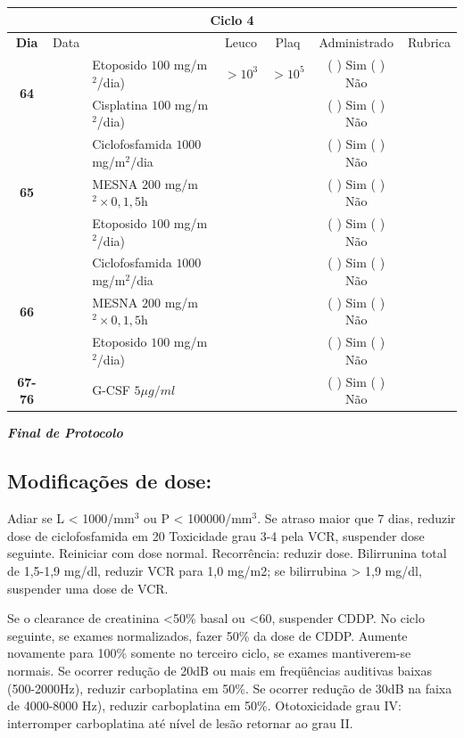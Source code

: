 \documentclass[11pt,a4paper,oldfontcommands]{memoir}
\begin{document}
\begin{center}
\begin{longtable}{p{1cm}c|p{5cm}|p{1.5cm}p{1.5cm}|c|c}
	\hline
	\multicolumn{7}{c}{Ciclo 4} \\
	\hline
	\multicolumn{1}{c|}{\multirow{1}{*}{\textbf{Dia}}}&{Data}&{}&\multicolumn{1}{c|}{Leuco}&\multicolumn{1}{c|}{Plaq}&{Administrado}&{Rubrica} \\
    \hline
    \multicolumn{1}{c|}{\multirow{2}{*}{\textbf{64}}}&&{Etoposido \(100\) mg/m\(^2\)/dia)}&\multicolumn{1}{c|}{\(>10^3\)}&\multicolumn{1}{c|}{\(>10^5\)}&{(  ) Sim (  ) Não}&\\
    \cline{4-5}
    \multicolumn{1}{c|}{}&\multirow{1}{*}{}&{Cisplatina \(100\) mg/m\(^2\)/dia)}&&&{(  ) Sim (  ) Não}&\\
    \hline
    \multicolumn{1}{c|}{\multirow{3}{*}{\textbf{65}}}&&{Ciclofosfamida \(1000\) mg/m\(^2\)/dia}&{}&&{(  ) Sim (  ) Não}&\\
    \multicolumn{1}{c|}{}&&{MESNA \(200\) mg/m\(^2 \times 0,1,5\)h}&&&{(  ) Sim (  ) Não}&\\
    \multicolumn{1}{c|}{}&&{Etoposido \(100\) mg/m\(^2\)/dia)}&&&{(  ) Sim (  ) Não}&\\
    \hline
    \multicolumn{1}{c|}{\multirow{3}{*}{\textbf{66}}}&&{Ciclofosfamida \(1000\) mg/m\(^2\)/dia}&{}&&{(  ) Sim (  ) Não}&\\
    \multicolumn{1}{c|}{}&&{MESNA \(200\) mg/m\(^2 \times 0,1,5\)h}&&&{(  ) Sim (  ) Não}&\\
    \multicolumn{1}{c|}{}&\multirow{1}{*}{}&{Etoposido \(100\) mg/m\(^2\)/dia)}&{}&&{(  ) Sim (  ) Não}&\\
    \hline
    \multicolumn{1}{c|}{\textbf{67-76}}&&{G-CSF \(5 \mu g/ml\) }&&&{(  ) Sim (  ) Não}&\\
    \hline
\end{longtable}
\textit{\textbf{Final de Protocolo}}
\end{center}
\subsection{Modificações de dose:}

Adiar se L < 1000/mm\(^3\) ou P < 100000/mm\(^3\). Se atraso maior que 7 dias, reduzir dose de ciclofosfamida em 20%
Toxicidade grau 3-4 pela VCR, suspender dose seguinte. Reiniciar com dose normal. Recorrência: reduzir dose.
Bilirrunina total de 1,5-1,9 mg/dl, reduzir VCR para 1,0 mg/m2; se bilirrubina > 1,9 mg/dl, suspender uma dose de VCR.

Se o clearance de creatinina <50\% basal ou <60, suspender CDDP. No ciclo seguinte, se exames normalizados, fazer 50\% da dose de CDDP. Aumente novamente para 100\% somente no terceiro ciclo, se exames mantiverem-se normais.
Se ocorrer redução de 20dB ou mais em freqüências auditivas baixas (500-2000Hz), reduzir carboplatina em 50\%. Se ocorrer redução de 30dB na faixa de 4000-8000 Hz), reduzir carboplatina em 50\%. Ototoxicidade grau IV: interromper carboplatina até nível de lesão retornar ao grau II.
\end{document}
